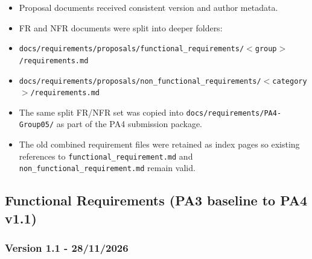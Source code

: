 \documentclass[12pt]{article}
\begin{document}
\begin{itemize}
\item Proposal documents received consistent version and author metadata.
\item FR and NFR documents were split into deeper folders:
\item \texttt{docs/requirements/proposals/functional\_requirements/$<$group$>$/requirements.md}
\item \texttt{docs/requirements/proposals/non\_functional\_requirements/$<$category$>$/requirements.md}
\item The same split FR/NFR set was copied into \texttt{docs/requirements/PA4-Group05/} as part of the PA4 submission package.
\item The old combined requirement files were retained as index pages so existing references to \texttt{functional\_requirement.md} and \texttt{non\_functional\_requirement.md} remain valid.
\end{itemize}
\par\medskip

\hypertarget{sec:functional-requirements-pa3-baseline-to-pa4-v1-1}{}
\subsection*{Functional Requirements (PA3 baseline to PA4 v1.1)}
\par\medskip

\hypertarget{sec:version-1-1-28-11-2026}{}
\subsubsection*{Version 1.1 - 28/11/2026}
\par\medskip
\end{document}
